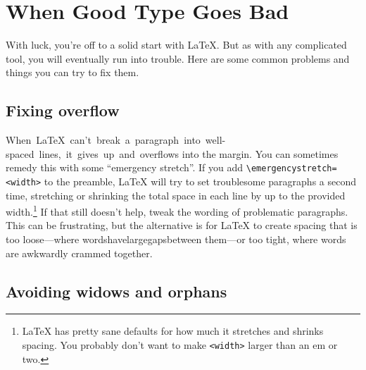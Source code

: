 \chapter{When Good Type Goes Bad}

With luck, you're off to a solid start with \LaTeX.
But as with any complicated tool, you will eventually run into trouble.
Here are some common problems and things you can try to fix them.

\section{Fixing overflow}

\mbox{When \LaTeX{} can't break a paragraph into well-spaced lines,
it gives up and overflows} into the margin.
You can sometimes remedy this with some ``emergency stretch''\quotekern.
If you add \texttt{\textbackslash emergencystretch=\allowbreak<width>}
to the preamble,
\LaTeX{} will try to set troublesome paragraphs a second time,
stretching or shrinking the total space in each line by up to the provided
width.\punckern\footnote{\LaTeX{} has pretty sane defaults for how much
it stretches and shrinks spacing.
You probably don't want to make \texttt{<width>} larger than an em or two.}
If that still doesn't help, tweak the wording of problematic paragraphs.
This can be frustrating, but the alternative is for \LaTeX{} to create spacing
that is too loose---where\quad
words\quad have\quad large\quad gaps\quad between\quad
them---or too tight, where\! words\! are\! awkwardly\! crammed\! together.

\section{Avoiding widows and orphans}

